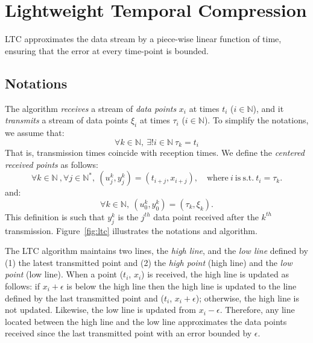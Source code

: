\documentclass[10pt, conference, compsocconf]{IEEEtran}
\begin{document}
\section{Lightweight Temporal Compression}
\label{sec:ltc}

LTC approximates the data stream
by a piece-wise linear function of time, ensuring that the error at
every time-point is bounded.

\subsection{Notations}

The algorithm \emph{receives} a stream of \emph{data points} $x_i$
at times $t_i$ ($i \in \mathbb{N}$), and it \emph{transmits} a stream of data points $\xi_i$
at times $\tau_i$ ($i \in \mathbb{N}$). To simplify the notations, we assume that:
\begin{equation*}
\forall k \in \mathbb{N}, \  \exists ! i \in \mathbb{N} \  \tau_k = t_i
\end{equation*}
That is, transmission times coincide with reception times.
We define the \emph{centered received points} as follows:
\begin{equation*}
\forall k \in \mathbb{N}\ , \forall j \in \mathbb{N^*},\ (u^k_j, y^k_j) = (t_{i+j}, x_{i+j}), \quad \mathrm{where\ }i\mathrm{\ is\ s.t.}\ t_i = \tau_k.
\end{equation*}
and:
\begin{equation*}
\forall k \in \mathbb{N},\  (u^k_0, y^k_0) = (\tau_k, \xi_k).
\end{equation*}
This definition is such that $y^k_j$ is the $j^{th}$ data point received
after the $k^{th}$ transmission.
Figure~\ref{fig:ltc} illustrates the notations and algorithm.

The LTC algorithm maintains two lines, the \emph{high line}, and the
\emph{low line} defined by (1) the latest transmitted point and (2) the
\emph{high point} (high line) and the \emph{low point} (low line). When
a point ($t_i$, $x_i$) is received, the high line is updated as
follows: if $x_i+\epsilon$ is below the high line then the high line is
updated to the line defined by the last transmitted point and ($t_i$,
$x_i+\epsilon$); otherwise, the high line is not updated. Likewise, the low line
is updated from $x_i-\epsilon$. Therefore, any line located between the
high line and the low line approximates the data points received since
the last transmitted point with an error bounded by $\epsilon$.
\end{document}
